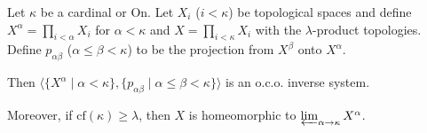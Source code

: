 Let $\kappa$ be a cardinal or $\mathrm{On}$. Let $X_i$ ($i < \kappa$) be topological spaces and define $X^{\alpha} = \prod_{i < \alpha} X_i$ for $\alpha < \kappa$ and $X = \prod_{i < \kappa} X_i$ with the $\lambda$-product topologies. Define $p_{\alpha\beta}$ ($\alpha \leq \beta < \kappa$) to be the projection from $X^{\beta}$ onto $X^{\alpha}$.

Then $\langle \{X^{\alpha} \mid \alpha < \kappa\}, \{p_{\alpha\beta} \mid \alpha \leq \beta < \kappa\} \rangle$ is an o.c.o. inverse system.

Moreover, if $\mathrm{cf}(\kappa) \geq \lambda$, then $X$ is homeomorphic to $\varprojlim_{\alpha \to \kappa} X^{\alpha}$.$$

